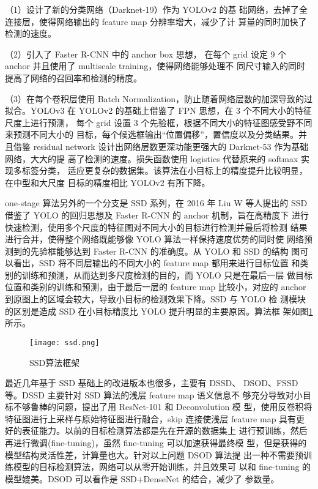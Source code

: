 （1）设计了新的分类网络（Darknet-19）作为 YOLOv2 的基
础网络，去掉了全连接层，使得网络输出的 feature map 分辨率增大，减少了计
算量的同时加快了检测的速度。

（2）引入了 Faster R-CNN 中的 anchor box 思想，
在每个 grid 设定 9 个 anchor 并且使用了 multiscale training，使得网络能够处理不
同尺寸输入的同时提高了网络的召回率和检测的精度。

（3）在每个卷积层使用
Batch Normalization，防止随着网络层数的加深导致的过拟合。YOLOv3 在
YOLOv2 的基础上借鉴了 FPN 思想，在 3 个不同大小的特征尺度上进行预测，
每个 grid 设置 3 个先验框，根据不同大小的特征图感受野不同来预测不同大小的
目标，每个候选框输出“位置偏移”，置信度以及分类结果。并且借鉴 residual
network 设计出网络层数更深功能更强大的 Darknet-53 作为基础网络，大大的提
高了检测的速度。损失函数使用 logistics 代替原来的 softmax 实现多标签分类，
适应更复杂的数据集。该算法在小目标上的精度提升比较明显，在中型和大尺度
目标的精度相比 YOLOv2 有所下降。

one-stage 算法另外的一个分支是 SSD 系列，在 2016 年 Liu W 等人提出的
SSD\cite{liu2016ssd}借鉴了 YOLO 的回归思想及 Faster R-CNN 的 anchor 机制，旨在高精度下
进行快速检测，使用多个尺度的特征图对不同大小的目标进行检测并最后将检测
结果进行合并，使得整个网络既能够像 YOLO 算法一样保持速度优势的同时使
网络预测到的先验框能够达到 Faster R-CNN 的准确度。从 YOLO 和 SSD 的结构
图可以看出，SSD 将不同层输出的不同大小的 feature map 都用来进行目标位置
和类别的训练和预测，从而达到多尺度检测的目的，而 YOLO 只是在最后一层
做目标位置和类别的训练和预测，由于最后一层的 feature map 比较小，对应的
anchor 到原图上的区域会较大，导致小目标的检测效果下降。SSD 与 YOLO 检
测模块的区别是造成 SSD 在小目标精度比 YOLO 提升明显的主要原因。算法框
架如图\ref{ssd}所示。

\begin{figure}[htbp]
    \centering
    \texttt{[image: ssd.png]}
    \caption{SSD算法框架}
    \label{ssd}
\end{figure}

最近几年基于 SSD 基础上的改进版本也很多，主要有 DSSD\cite{fu2017dssd}、
DSOD\cite{shen2017dsod}、FSSD\cite{li2017fssd}等。DSSD 主要针对 SSD 算法的浅层 feature map 语义信息不
够充分导致对小目标不够鲁棒的问题，提出了用 ResNet-101 和 Deconvolution 模
型，使用反卷积将特征图进行上采样与原始特征图进行融合，skip 连接使浅层
feature map 具有更好的表征能力。以前的目标检测算法都是先在开源的数据集上
进行预训练，然后再进行微调(fine-tuning)，虽然 fine-tuning 可以加速获得最终模
型，但是获得的模型结构灵活性差，计算量也大。针对以上问题 DSOD 算法提
出一种不需要预训练模型的目标检测算法，网络可以从零开始训练，并且效果可
以和 fine-tuning 的模型媲美。DSOD 可以看作是 SSD+DenseNet 的结合，减少了
参数量。

